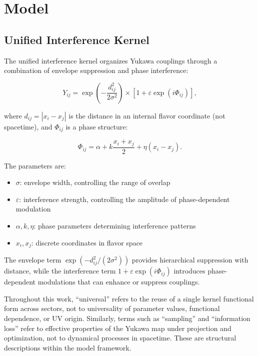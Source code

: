 \documentclass[12pt,a4paper]{article}
\begin{document}
\section{Model}

\subsection{Unified Interference Kernel}

The unified interference kernel organizes Yukawa couplings through a combination of envelope suppression and phase interference:

\begin{equation}
Y_{ij} = \exp\left(-\frac{d_{ij}^2}{2\sigma^2}\right) \times \left[1 + \varepsilon \exp(i\Phi_{ij})\right],
\end{equation}

where $d_{ij} = |x_i - x_j|$ is the distance in an internal flavor coordinate (not spacetime), and $\Phi_{ij}$ is a phase structure:

\begin{equation}
\Phi_{ij} = \alpha + k\frac{x_i + x_j}{2} + \eta(x_i - x_j).
\end{equation}

The parameters are:
\begin{itemize}
\item $\sigma$: envelope width, controlling the range of overlap
\item $\varepsilon$: interference strength, controlling the amplitude of phase-dependent modulation
\item $\alpha, k, \eta$: phase parameters determining interference patterns
\item $x_i, x_j$: discrete coordinates in flavor space
\end{itemize}

The envelope term $\exp(-d_{ij}^2/(2\sigma^2))$ provides hierarchical suppression with distance, while the interference term $1 + \varepsilon \exp(i\Phi_{ij})$ introduces phase-dependent modulations that can enhance or suppress couplings.

Throughout this work, ``universal'' refers to the reuse of a single kernel functional form across sectors, not to universality of parameter values, functional dependence, or UV origin. Similarly, terms such as ``sampling'' and ``information loss'' refer to effective properties of the Yukawa map under projection and optimization, not to dynamical processes in spacetime. These are structural descriptions within the model framework.
\end{document}
